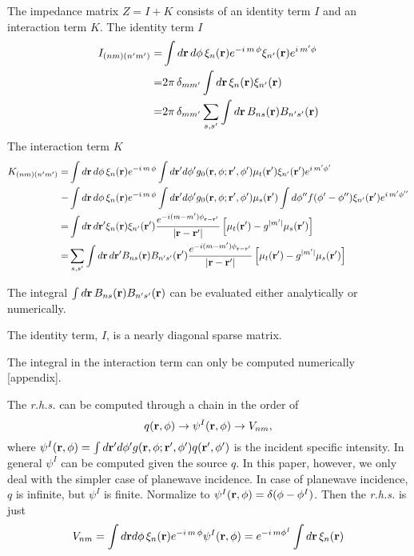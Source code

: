 \documentclass[main]{subfiles}
\begin{document}
The impedance matrix $Z=I+K$ consists of an identity term $I$ and an interaction
term $K$. The identity term $I$
\begin{equation*}
	\begin{split} 
		I_{(nm)(n^{\prime} m^{\prime})} =& \int d\mathbf{r}\,d\phi \,\xi_n(\mathbf{r})
		e^{-i\,m\,\phi}\xi_{n^{\prime}}(\mathbf{r})e^{i\,m^{\prime}\phi} \\
		=& 2\pi\,\delta_{mm^{\prime}}\int d\mathbf{r}\,\xi_n(\mathbf{r})\xi_{n^{\prime}}(\mathbf{r})
		\\ =& 2\pi\,\delta_{mm^{\prime}}\sum\limits_{s,s^{\prime}} 
		\int d\mathbf{r}\,B_{ns}(\mathbf{r})B_{n^{\prime} s^{\prime}}(\mathbf{r})
	\end{split}
\end{equation*}
The interaction term $K$
\begin{equation*}
	\begin{split}
		K_{(nm)(n^{\prime} m^{\prime})} =& \int d\mathbf{r}\,d\phi\,\xi_n(\mathbf{r})
		e^{-i\,m\,\phi} \int d\mathbf{r}^{\prime} d\phi^{\prime}
		g_0(\mathbf{r},\phi;\mathbf{r}^{\prime},\phi^{\prime}) \mu_t(\mathbf{r}^{\prime}) 
		\xi_{n^{\prime}}(\mathbf{r}^{\prime}) e^{i\,m^{\prime}\phi^{\prime}} \\
		-& \int d\mathbf{r}\,d\phi\,\xi_n(\mathbf{r}) e^{-i\,m\,\phi} 
		\int d\mathbf{r}^{\prime} d\phi^{\prime} g_0(\mathbf{r},\phi;\mathbf{r}^{\prime},\phi^{\prime}) 
		\mu_s(\mathbf{r}^{\prime}) \int d\phi^{{\prime\prime}} f(\phi^{\prime}-\phi^{{\prime\prime}})
		\xi_{n^{\prime}}(\mathbf{r^{\prime}}) e^{i\,m^{\prime} \phi^{{\prime\prime}}} \\
		=& \int d\mathbf{r}\,d\mathbf{r}^{\prime} \xi_n(\mathbf{r}) \xi_{n^{\prime}}(\mathbf{r}^{\prime})
		\frac{e^{-i(m-m^{\prime})\phi_{\mathbf{r}-\mathbf{r}^{\prime}}}}
		{\left\vert \mathbf{r}-\mathbf{r}^{\prime} \right\vert}
		\left[ \mu_t(\mathbf{r}^{\prime})-g^{|m^{\prime}|}\mu_s(\mathbf{r}^{\prime})\right] \\
		=& \sum\limits_{s,s^{\prime}} 
		\int d\mathbf{r}\,d\mathbf{r}^{\prime} B_{ns}(\mathbf{r}) B_{n^{\prime} s^{\prime}}(\mathbf{r}^{\prime})
		\frac{e^{-i(m-m^{\prime})\phi_{\mathbf{r}-\mathbf{r}^{\prime}}}}
		{\left\vert \mathbf{r}-\mathbf{r}^{\prime} \right\vert}
		\left[ \mu_t(\mathbf{r}^{\prime})-g^{|m^{\prime}|}\mu_s(\mathbf{r}^{\prime})\right]
	\end{split}
\end{equation*}

The integral $\int d\mathbf{r}\,B_{ns}(\mathbf{r})B_{n^{\prime} s^{\prime}}(\mathbf{r})$ can be evaluated
either analytically or numerically. 

The identity term, $I$, is a nearly diagonal sparse matrix.  

The integral in the interaction term can only be computed numerically [appendix].  

The \textit{r.h.s.} can be computed through a chain in the order of
\begin{equation*}
	q(\mathbf{r},\phi) \to \psi^I(\mathbf{r},\phi) \to V_{nm},
\end{equation*}
where $\psi^I(\mathbf{r},\phi)=\int d\mathbf{r}^{\prime} d\phi^{\prime} g(\mathbf{r},\phi;\mathbf{r}^{\prime},\phi^{\prime})
q(\mathbf{r}^{\prime},\phi^{\prime})$ is the incident specific intensity. In general $\psi^I$ can
be computed given the source $q$. In this paper, however, we only deal with the
simpler case of planewave incidence. In case of planewave incidence, $q$ is 
infinite, but $\psi^I$ is finite. Normalize to $\psi^I(\mathbf{r},\phi) = 
\delta(\phi-\phi^I)$. Then the \textit{r.h.s.} is just
\begin{equation*}
	V_{nm} = \int d\mathbf{r}d\phi\,\xi_n(\mathbf{r})e^{-i\,m\,\phi}\psi^I(\mathbf{r},\phi) =
	e^{-i\,m\phi^I} \int d\mathbf{r}\,\xi_n(\mathbf{r})
\end{equation*}

\end{document}
